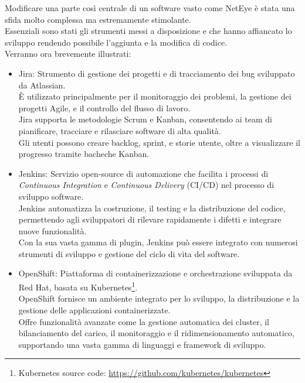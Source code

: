 Modificare una parte così centrale di un software vasto come NetEye è stata una
sfida molto complessa ma estremamente stimolante.\\ Essenziali sono stati gli
strumenti messi a disposizione e che hanno affiancato lo sviluppo rendendo
possibile l'aggiunta e la modifica di codice.\\ Verranno ora brevemente
illustrati:
\begin{itemize}
  \item Jira: Strumento di gestione dei progetti e di tracciamento dei bug
    sviluppato da Atlassian.\\ È utilizzato principalmente per il monitoraggio
    dei problemi, la gestione dei progetti Agile, e il controllo del flusso di
    lavoro.\\ Jira supporta le metodologie Scrum e Kanban, consentendo ai team di
    pianificare, tracciare e rilasciare software di alta qualità.\\ Gli utenti
    possono creare backlog, sprint, e storie utente, oltre a visualizzare il progresso
    tramite bacheche Kanban.

  \item Jenkins: Servizio open-source di automazione che facilita i processi di
    \textit{Continuous Integration} e \textit{Continuous Delivery} (CI/CD) nel
    processo di sviluppo software.\\ Jenkins automatizza la costruzione, il testing
    e la distribuzione del codice, permettendo agli sviluppatori di rilevare
    rapidamente i difetti e integrare nuove funzionalità.\\ Con la sua vasta
    gamma di plugin, Jenkins può essere integrato con numerosi strumenti di sviluppo
    e gestione del ciclo di vita del software.

  \item OpenShift: Piattaforma di containerizzazione e orchestrazione sviluppata
    da Red Hat, basata su Kubernetes\footnote{\label{kubernetes_note}Kubernetes source
    code: \url{https://github.com/kubernetes/kubernetes}}.\\ OpenShift fornisce
    un ambiente integrato per lo sviluppo, la distribuzione e la gestione delle applicazioni
    containerizzate.\\ Offre funzionalità avanzate come la gestione automatica dei
    cluster, il bilanciamento del carico, il monitoraggio e il ridimensionamento
    automatico, supportando una vasta gamma di linguaggi e framework di sviluppo.


\end{itemize}
